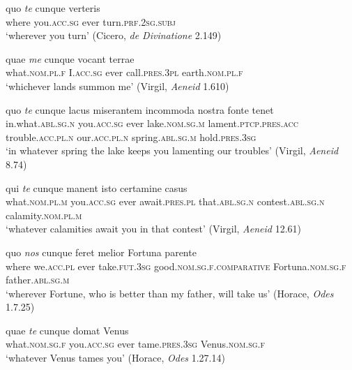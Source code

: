 \begin{exe}
\ex
\gll quo \emph{te} cunque verteris\\
where you.\textsc{acc.sg} ever turn.\textsc{prf.2sg.subj}\\
\trans `wherever you turn' (Cicero, \textit{de Divinatione} 2.149)
\label{quicumque10}
\end{exe}

\begin{exe}
\ex
\gll quae \emph{me} cunque vocant terrae\\
what.\textsc{nom.pl.f} I.\textsc{acc.sg} ever call.\textsc{pres.3pl} earth.\textsc{nom.pl.f}\\
\trans `whichever lands summon me' (Virgil, \textit{Aeneid} 1.610)
\label{quicumque11}
\end{exe}

\begin{exe}
\ex
\gll quo \emph{te} cunque lacus miserantem incommoda nostra fonte tenet\\
in.what.\textsc{abl.sg.n} you.\textsc{acc.sg} ever lake.\textsc{nom.sg.m} lament.\textsc{ptcp.pres.acc} trouble.\textsc{acc.pl.n} our.\textsc{acc.pl.n} spring.\textsc{abl.sg.m} hold.\textsc{pres.3sg}\\
\trans `in whatever spring the lake keeps you lamenting our troubles' (Virgil, \textit{Aeneid} 8.74)
\label{quicumque12}
\end{exe}

\begin{exe}
\ex
\gll qui \emph{te} cunque manent isto certamine casus\\
what.\textsc{nom.pl.m} you.\textsc{acc.sg} ever await.\textsc{pres.pl} that.\textsc{abl.sg.n} contest.\textsc{abl.sg.n} calamity.\textsc{nom.pl.m}\\
\trans `whatever calamities await you in that contest' (Virgil, \textit{Aeneid} 12.61)
\label{quicumque13}
\end{exe}

\begin{exe}
\ex
\gll quo \emph{nos} cunque feret melior Fortuna parente\\
where we.\textsc{acc.pl} ever take.\textsc{fut.3sg} good.\textsc{nom.sg.f.comparative} Fortuna.\textsc{nom.sg.f} father.\textsc{abl.sg.m}\\
\trans `wherever Fortune, who is better than my father, will take us' (Horace, \textit{Odes} 1.7.25)
\label{quicumque14}
\end{exe}

\begin{exe}
\ex
\gll quae \emph{te} cunque domat Venus\\
what.\textsc{nom.sg.f} you.\textsc{acc.sg} ever tame.\textsc{pres.3sg} Venus.\textsc{nom.sg.f}\\
\trans `whatever Venus tames you' (Horace, \textit{Odes} 1.27.14)
\label{quicumque15}
\end{exe}

